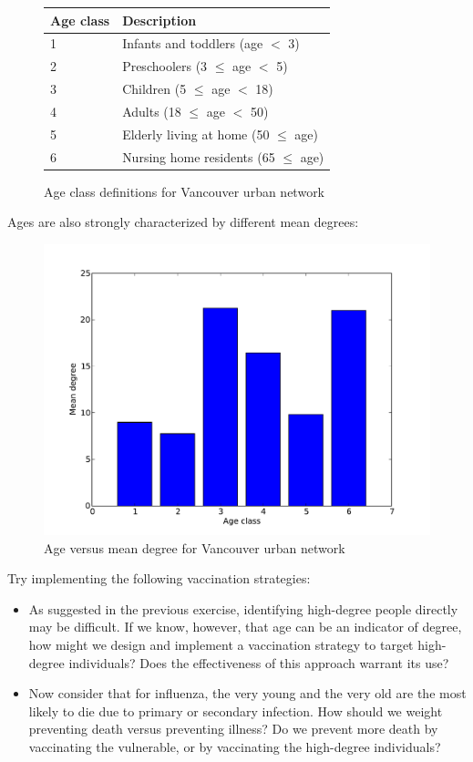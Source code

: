 \documentclass{article}
\begin{document}
\UndefineShortVerb{\|}
\begin{figure}[h]
\begin{center}
\begin{tabular}{|ll|}
\hline
Age class & Description \\ \hline
1 & Infants and toddlers (age $<$ 3) \\ 
2 & Preschoolers (3 $\leq$ age $<$ 5) \\ 
3 & Children (5 $\leq$ age $<$ 18) \\ 
4 & Adults (18 $\leq$ age $<$ 50) \\ 
5 & Elderly living at home (50 $\leq$ age) \\ 
6 & Nursing home residents (65 $\leq$ age) \\
\hline
\end{tabular}
\caption{Age class definitions for Vancouver urban network}
\end{center}
\end{figure}
\DefineShortVerb{\|}

Ages are also strongly characterized by different mean degrees:
\begin{figure}[h]
\begin{center}
\includegraphics[width = 5in]{age_vs_deg.pdf}
\caption{Age versus mean degree for Vancouver urban network}
\end{center}
\end{figure}

Try implementing the following vaccination strategies:
\begin{itemize}
\item As suggested in the previous exercise, identifying high-degree people directly may be difficult.  If we know,
however, that age can be an indicator of degree, how might we design and implement a vaccination strategy to target high-degree individuals?
Does the effectiveness of this approach warrant its use?
\item Now consider that for influenza, the very young and the very old are the most likely to die due to primary or secondary infection.  How should we
weight preventing death versus preventing illness?  Do we prevent more death by vaccinating the vulnerable, or by vaccinating the high-degree individuals?
\end{itemize}
\end{document}
